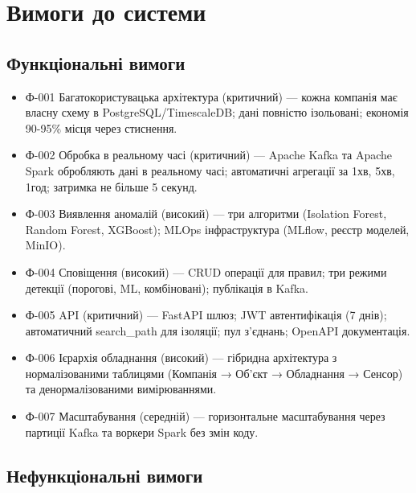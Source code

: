 \section{Вимоги до системи}

\subsection{Функціональні вимоги}

\begin{itemize}
    \item Ф-001 Багатокористувацька архітектура (критичний) --- кожна компанія має власну схему в PostgreSQL/TimescaleDB; дані повністю ізольовані; економія 90-95\% місця через стиснення.
    \item Ф-002 Обробка в реальному часі (критичний) --- Apache Kafka та Apache Spark обробляють дані в реальному часі; автоматичні агрегації за 1хв, 5хв, 1год; затримка не більше 5 секунд.
    \item Ф-003 Виявлення аномалій (високий) --- три алгоритми (Isolation Forest, Random Forest, XGBoost); MLOps інфраструктура (MLflow, реєстр моделей, MinIO).
    \item Ф-004 Сповіщення (високий) --- CRUD операції для правил; три режими детекції (порогові, ML, комбіновані); публікація в Kafka.
    \item Ф-005 API (критичний) --- FastAPI шлюз; JWT автентифікація (7 днів); автоматичний search\_path для ізоляції; пул з'єднань; OpenAPI документація.
    \item Ф-006 Ієрархія обладнання (високий) --- гібридна архітектура з нормалізованими таблицями (Компанія → Об'єкт → Обладнання → Сенсор) та денормалізованими вимірюваннями.
    \item Ф-007 Масштабування (середній) --- горизонтальне масштабування через партиції Kafka та воркери Spark без змін коду.
\end{itemize}

\subsection{Нефункціональні вимоги}

